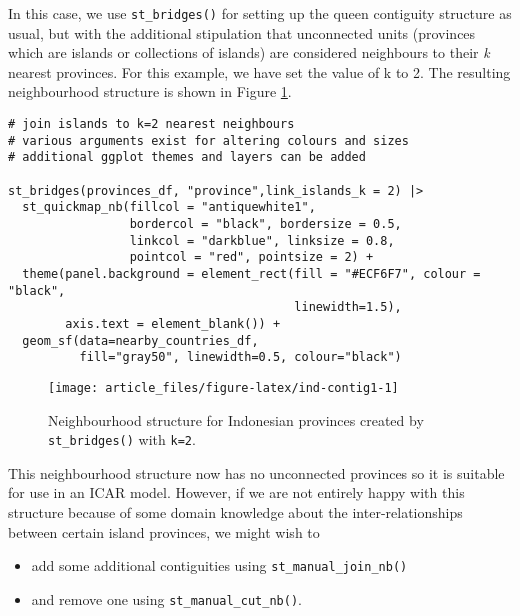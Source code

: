 In this case, we use \texttt{st\_bridges()} for setting up the queen contiguity
structure as usual, but with the additional stipulation that unconnected
units (provinces which are islands or collections of islands) are
considered neighbours to their \emph{k} nearest provinces. For this example,
we have set the value of k to 2. The resulting neighbourhood structure
is shown in Figure \ref{fig:ind-contig1}.



\begin{verbatim}
# join islands to k=2 nearest neighbours
# various arguments exist for altering colours and sizes
# additional ggplot themes and layers can be added

st_bridges(provinces_df, "province",link_islands_k = 2) |> 
  st_quickmap_nb(fillcol = "antiquewhite1", 
                 bordercol = "black", bordersize = 0.5, 
                 linkcol = "darkblue", linksize = 0.8, 
                 pointcol = "red", pointsize = 2) + 
  theme(panel.background = element_rect(fill = "#ECF6F7", colour = "black", 
                                        linewidth=1.5),
        axis.text = element_blank()) +
  geom_sf(data=nearby_countries_df, 
          fill="gray50", linewidth=0.5, colour="black")
\end{verbatim}

\begin{figure}

{\centering \texttt{[image: article\_files/figure-latex/ind-contig1-1]} 

}

\caption{Neighbourhood structure for Indonesian provinces created by \texttt{st\_bridges()} with \texttt{k=2}.}\label{fig:ind-contig1}
\end{figure}

This neighbourhood structure now has no unconnected provinces so it is
suitable for use in an ICAR model. However, if we are not entirely happy with this structure because of some domain knowledge about the inter-relationships between certain island provinces, we might wish to

\begin{itemize}
\item
  add some additional contiguities using \texttt{st\_manual\_join\_nb()}
\item
  and remove one using \texttt{st\_manual\_cut\_nb()}.
\end{itemize}

